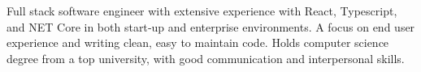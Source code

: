 

\begin{cvparagraph}

Full stack software engineer with extensive experience with React, Typescript, and NET Core in both start‑up and enterprise environments. 
A focus on end user experience and writing clean, easy to maintain code. 
Holds computer science degree from a top university, with good communication and interpersonal skills.
\end{cvparagraph}
